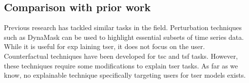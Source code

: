 \subsection{Comparison with prior work} 
 Previous research has tackled similar tasks in the field. Perturbation techniques such as DynaMask \cite{crabbe_explaining_2021} can be used to highlight essential subsets of time series data. While it is useful for exp
 laining \gls{tser}, it does not focus on the user. Counterfactual techniques have been developed for \gls{tsc} \cite{hollig_tsevo_2022, delaney_instance-based_2021} and \gls{tsf} \cite{wang_counterfactual_2023} tasks. However, these techniques require some modifications to explain \gls{tser} tasks. As far as we know, no explainable technique specifically targeting users for \gls{tser} models exists.

